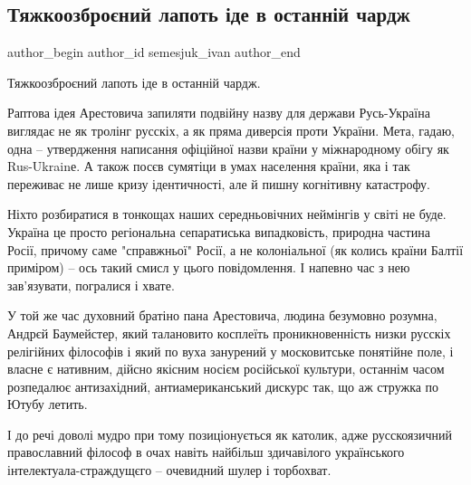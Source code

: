  
 
 
 
 
 
\subsection{Тяжкоозброєний лапоть іде в останній чардж}
\label{sec:03_09_2021.fb.semesjuk_ivan.1.lapotj_arestovich_rusj_ukraina}
 
\ifcmt
 author_begin
   author_id semesjuk_ivan
 author_end
\fi

Тяжкоозброєний лапоть іде в останній чардж.

Раптова ідея Арестовича запиляти подвійну назву для держави Русь-Україна
виглядає не як тролінг русскіх, а як пряма диверсія проти України. Мета, гадаю,
одна – утвердження написання офіційної назви країни у міжнародному обігу як
Rus-Ukrainе. А також посєв сумятіци в умах населення країни, яка і так
переживає не лише кризу ідентичності, але й пишну когнітивну катастрофу.

Ніхто розбиратися в тонкощах наших середньовічних неймінгів у світі не буде.
Україна це просто регіональна сепаратиська випадковість, природна частина
Росії, причому саме "справжньої" Росії, а не колоніальної (як колись країни
Балтії приміром) – ось такий смисл у цього повідомлення. І напевно час з нею
зав'язувати, погралися і хвате.

У той же час духовний братіно пана Арестовича, людина безумовно розумна, Андрєй
Баумейстер, який талановито косплеїть проникновенність низки русскіх релігійних
філософів і який по вуха занурений у московитське понятійне поле, і власне є
нативним, дійсно якісним носієм російської культури, останнім часом розпедалює
антизахідний, антиамериканський дискурс так, що аж стружка по Ютубу летить. 

І до речі доволі мудро при тому позиціонується як католик, адже русскоязичний
православний філософ в очах навіть найбільш здичавілого українського
інтелектуала-страждущєго – очевидний шулер і торбохват.

